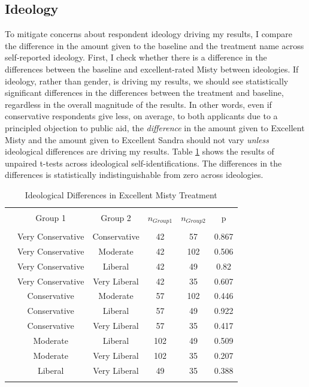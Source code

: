 \documentclass[12pt]{article}%
\begin{document}
\begin{doublespace}
\subsection*{Ideology}
To mitigate concerns about respondent ideology driving my results, I compare the difference in the amount given to the baseline and the treatment name across self-reported ideology. First, I check whether there is a difference in the differences between the baseline and excellent-rated Misty between ideologies. If ideology, rather than gender, is driving my results, we should see statistically significant differences in the differences between the treatment and baseline, regardless in the overall magnitude of the results. In other words, even if conservative respondents give less, on average, to both applicants due to a principled objection to public aid, the \textit{difference} in the amount given to Excellent Misty and the amount given to Excellent Sandra should not vary \textit{unless} ideological differences are driving my results. Table \ref{ideo-mist} shows the results of unpaired t-tests across ideological self-identifications. The differences in the differences is statistically indistinguishable from zero across ideologies.

\begin{table}[!htbp] \centering 
	\caption{Ideological Differences in Excellent Misty Treatment} 
	\label{ideo-mist} 
	\begin{tabular}{@{\extracolsep{5pt}} cccccc} 
		\\[-1.8ex]\hline 
		\hline \\[-1.8ex] 
		& Group 1 & Group 2 & $n_{Group 1}$ & $n_{Group 2}$ & p \\ 
		\hline \\[-1.8ex] 
		& Very Conservative & Conservative & 42 & 57 & 0.867 \\ 
		 & Very Conservative & Moderate & 42 & 102 & 0.506 \\ 
		 & Very Conservative & Liberal & 42 & 49 & 0.82 \\ 
		 & Very Conservative & Very Liberal & 42 & 35 & 0.607 \\ 
		 & Conservative & Moderate & 57 & 102 & 0.446 \\ 
		 & Conservative & Liberal & 57 & 49 & 0.922 \\ 
		 & Conservative & Very Liberal & 57 & 35 & 0.417 \\ 
		 & Moderate & Liberal & 102 & 49 & 0.509 \\ 
		 & Moderate & Very Liberal & 102 & 35 & 0.207 \\ 
		 & Liberal & Very Liberal & 49 & 35 & 0.388 \\ 
		\hline \\[-1.8ex] 
	\end{tabular} 
\end{table} 


\end{doublespace}
\end{document}

